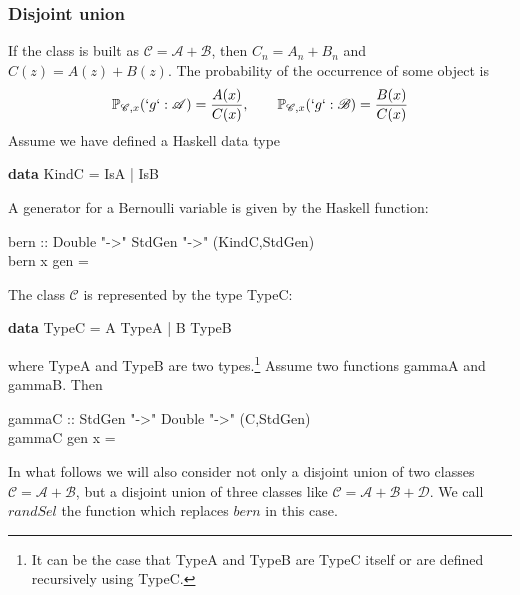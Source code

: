 \documentclass{sig-alternate}
\newcommand{\C}{\mathscr{C}}
\newcommand{\PP}{\mathbb{P}}
\begin{document}
\subsubsection*{Disjoint union}

If the class is built as $\C = \mathscr{A} + \mathscr{B}$, then $C_n = A_n + B_n$ and
$C(z) = A(z) + B(z)$.  The probability of the occurrence of some object is
\begin{displaymath}
  \PP_{\C,x}(`g`:\mathscr{A}) = \frac{A(x)}{C(x)}, \qquad \PP_{\C,x}(`g`:\mathscr{B)} = \frac{B(x)}{C(x)}
\end{displaymath}
Assume we have defined a \textsf{Haskell} data type
\begin{haskell}
  \textbf{data} KindC = IsA | IsB
\end{haskell}
A generator for a Bernoulli variable is given by the \textsf{Haskell} function:
\begin{haskell}
  bern :: Double "->" StdGen "->" (KindC,StdGen)\\
  bern x gen = 
\end{haskell}

The class $\C$ is represented by the type \<TypeC\>:
\begin{haskell}
  \textbf{data} TypeC = A TypeA | B TypeB
\end{haskell}
where \<TypeA\> and \<TypeB\> are two types.\footnote{It can be the case that
  \<TypeA\> and \<TypeB\> are \<TypeC\> itself or are defined recursively using
  \<TypeC\>.}  Assume two functions \<gammaA\> and \<gammaB\>.  Then
\begin{normalsize}
  \begin{haskell}
    gammaC :: StdGen "->" Double "->" (C,StdGen)\\
    gammaC gen x = 
  \end{haskell}
\end{normalsize}
In what follows we will also consider not only a disjoint union of two classes $\C =
\mathscr{A} + \mathscr{B}$, but a disjoint union of three classes like $\C =
\mathscr{A} + \mathscr{B} + \mathscr{D}$.  We call  $randSel$ the function
which replaces $bern$ in this case.
\end{document}
